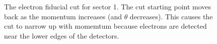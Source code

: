 \begin{figure}[hb]
	\centering
			\caption{The electron fiducial cut for sector 1. The cut starting point moves back
						as the momentum increases (and $\theta$ decreases). This causes the cut
						to narrow up with momemtum because electrons are detected near the lower
						edges of the detectors.}
			\label{fig:fidu_e3d}
\end{figure}



\clearpage\newpage








